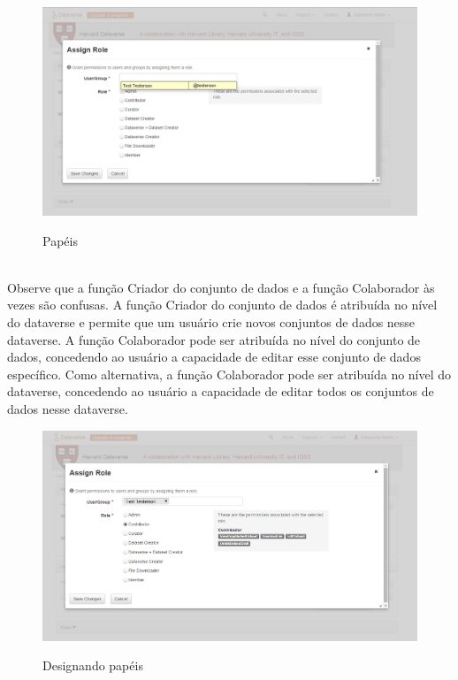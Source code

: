 \documentclass[12pt,hidelinks]{article}
\begin{document}
\begin{figure}[H]
  \caption{Papéis}
        \centering
     \includegraphics[scale=0.4]{imagens/prt4.png}
            \label{Acesso 2}
        \end{figure}
\\
        
Observe que a função Criador do conjunto de dados e a função Colaborador às vezes são confusas. A função Criador do conjunto de dados é atribuída no nível do dataverse e permite que um usuário crie novos conjuntos de dados nesse dataverse. A função Colaborador pode ser atribuída no nível do conjunto de dados, concedendo ao usuário a capacidade de editar esse conjunto de dados específico. Como alternativa, a função Colaborador pode ser atribuída no nível do dataverse, concedendo ao usuário a capacidade de editar todos os conjuntos de dados nesse dataverse.

\begin{figure}[H]
 \caption{Designando papéis}
                \centering           \includegraphics[scale=0.4]{imagens/prt5.png}
            \label{Acesso 3}
        \end{figure}
\\
\end{document}
